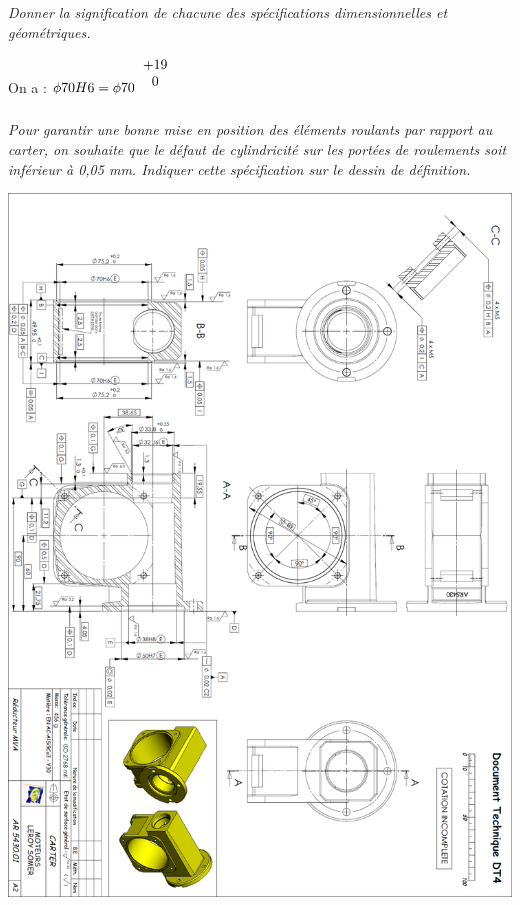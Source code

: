 \documentclass[10pt,fleqn]{article} %
\begin{document}
\begin{multicols}{2}
\subparagraph{}\textit{Donner la signification de chacune des spécifications dimensionnelles et géométriques.}

\begin{rem}
On a : $\phi 70 H6 = \phi 70 ^{\begin{tabular}{c}+19 \\ 0\end{tabular}}$
\end{rem}
\subparagraph{}\textit{Pour garantir une bonne mise en position des éléments roulants par rapport au carter, on souhaite que le défaut de cylindricité sur les portées de roulements soit inférieur à 0,05 mm. Indiquer cette spécification sur le dessin de définition.}
\end{multicols}

\begin{center}
\includegraphics[width=\textwidth]{images/reducteur_03}
\end{center}
\end{document}
